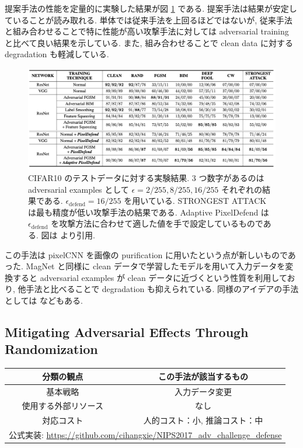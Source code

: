 提案手法の性能を定量的に実験した結果が図 \ref{fig:pixeldefend-cifar10} である.
提案手法は結果が安定していることが読み取れる.
単体では従来手法を上回るほどではないが, 従来手法と組み合わせることで特に性能が高い攻撃手法に対しては adversarial training と比べて良い結果を示している.
また, 組み合わせることで clean data に対する degradation も軽減している.
%
\begin{figure}[htbp]
\begin{center}
\includegraphics[width=14.0cm]{figures/pixeldefend-cifar10.pdf}
\end{center}
\caption{
CIFAR10 のテストデータに対する実験結果.
3 つ数字があるのは adversarial examples として $\epsilon = 2/255, 8/255, 16/255$ それぞれの結果である.
$\epsilon_{\text{defend}} = 16/255$ を用いている.
STRONGEST ATTACK は最も精度が低い攻撃手法の結果である.
Adaptive PixelDefend は $\epsilon_{\text{defend}}$ を攻撃方法に合わせて適した値を手で設定しているものである.
図は \cite{song2017pixeldefend} より引用.
}
\label{fig:pixeldefend-cifar10}
\end{figure}

この手法は pixelCNN を画像の purification に用いたという点が新しいものであった.
MagNet と同様に clean データで学習したモデルを用いて入力データを変換すると adversarial examples が clean データに近づくという性質を利用しており, 他手法と比べることで degradation も抑えられている.
同様のアイデアの手法としては \cite{mustafa2019image} などもある.



\subsection{Mitigating Adversarial Effects Through Randomization}
\label{subsec:mitigating-adversarial}
%
\begin{table}[htbp]
\begin{center}
\begin{tabular}{|c|c|}
\hline
分類の観点 & この手法が該当するもの \\
\hline
基本戦略 & 入力データ変更 \\
使用する外部リソース & なし \\
対応コスト & 人的コスト：小, 推論コスト：中 \\
\hline
\multicolumn{2}{|c|}{公式実装: \href{https://github.com/cihangxie/NIPS2017_adv_challenge_defense}{https://github.com/cihangxie/NIPS2017\_adv\_challenge\_defense}} \\
\hline
\end{tabular}
\label{tb:mitigating-adversarial-summary}
\end{center}
\end{table}
%

